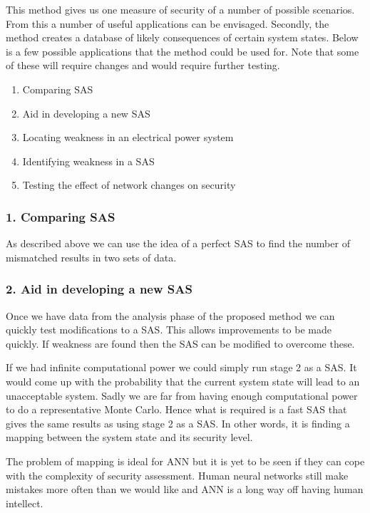 \documentclass[a4paper,oneside,12pt]{report}
\begin{document}
This method gives us one measure of security of a number of possible scenarios. From this a number of useful applications can be envisaged. Secondly, the method creates a database of likely consequences of certain system states. Below is a few possible applications that the method could be used for. Note that some of these will require changes and would require further testing.

\begin{enumerate}
\item Comparing SAS
\item Aid in developing a new SAS
\item Locating weakness in an electrical power system
\item Identifying weakness in a SAS
\item Testing the effect of network changes on security
\end{enumerate}

\subsubsection{1. Comparing SAS}

As described above we can use the idea of a perfect SAS to find the number of mismatched results in two sets of data.

\subsubsection{2. Aid in developing a new SAS}

Once we have data from the analysis phase of the proposed method we can quickly test modifications to a SAS. This allows improvements to be made quickly. If weakness are found then the SAS can be modified to overcome these.

If we had infinite computational power we could simply run stage 2 as a SAS. It would come up with the probability that the current system state will lead to an unacceptable system. Sadly we are far from having enough computational power to do a representative Monte Carlo. Hence what is required is a fast SAS that gives the same results as using stage 2 as a SAS. In other words, it is finding a mapping between the system state and its security level.

The problem of mapping is ideal for ANN but it is yet to be seen if they can cope with the complexity of security assessment. Human neural networks still make mistakes more often than we would like and ANN is a long way off having human intellect.
\end{document}
